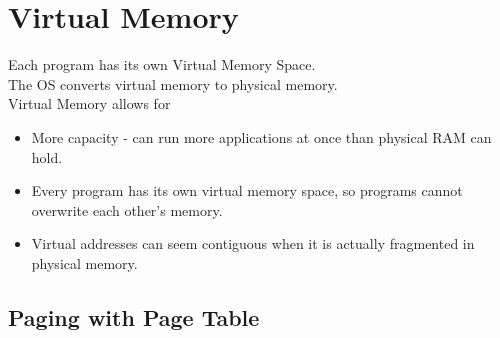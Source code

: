 \documentclass[10pt]{article}
\begin{document}
\section*{Virtual Memory}


Each program has its own Virtual Memory Space.\\
The OS converts virtual memory to physical memory.\\
Virtual Memory allows for
\begin{itemize}
    \item More capacity - can run more applications at once than physical RAM can hold.
    \item Every program has its own virtual memory space, so programs cannot overwrite each other's memory.
    \item Virtual addresses can seem contiguous when it is actually fragmented in physical memory.
\end{itemize}
\subsection*{Paging with Page Table}
\end{document}
